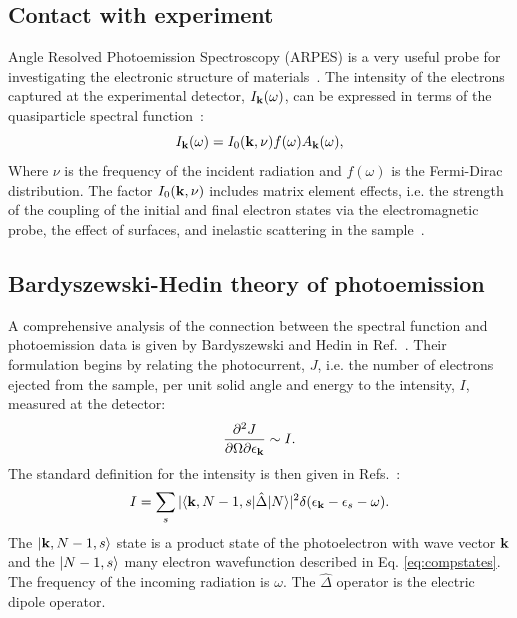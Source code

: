 \subsection{Contact with experiment}
\noindent
Angle Resolved Photoemission Spectroscopy (ARPES) is a very useful
probe for investigating the electronic structure of materials~\cite{damascelli04}.
%
The intensity of the electrons captured at the experimental detector, $I_{{\bf k}}(\omega)$,
can be expressed in terms of the quasiparticle spectral function~\cite{damascelli04}:
%
\begin{equation}
\label{eq:photoemission}
I_{{\bf k}}(\omega) = I_{0}({\bf k},\nu)f(\omega)A_{{\bf k}}(\omega),
\end{equation}
%
Where $\nu$ is the frequency of the incident radiation and $f(\omega)$ is the Fermi-Dirac distribution.
The factor $I_{0}({\bf k},\nu)$ includes matrix element effects, i.e.
the strength of the coupling of the initial and final electron states via
the electromagnetic probe, the effect of surfaces, and 
inelastic scattering in the sample~\cite{damascelli04}.

\subsection{Bardyszewski-Hedin theory of photoemission}
\noindent
A comprehensive analysis of the connection between the spectral function
and photoemission data is given by Bardyszewski and Hedin in Ref.~\cite{bardy85}.
Their formulation begins by relating the photocurrent, $J$, i.e. the number
of electrons ejected from the sample, per unit solid angle and energy
to the intensity, $I$, measured at the detector:
%
\begin{equation}
\frac{\partial^{2}J}{\partial \Omega \partial \epsilon_{{\bf k}}} \sim I.
\end{equation}
%
The standard definition for the intensity is then given in Refs.~\cite{goldberger64, almbladh83}:
%
\begin{equation}
\label{eq:intens}
I = \sum_{s}|\langle {\bf k},N-1,s|\hat{\Delta}|N\rangle|^{2}\delta(\epsilon_{{\bf k}}-\epsilon_{s}-\omega).
\end{equation}
%
The $|{\bf k},N-1,s\rangle$ state is a product state of the photoelectron with wave vector
${\bf k}$ and the $|N-1, s\rangle$ many electron wavefunction described in Eq. \ref{eq:compstates}.
The frequency of the incoming radiation is $\omega$. The $\hat{\Delta}$
operator is the electric dipole operator.

